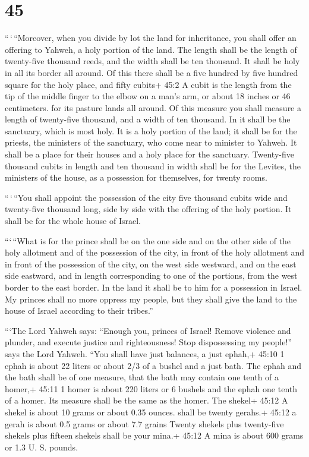 \hypertarget{section-43}{%
\section{45}\label{section-43}}

 ``\,`\,``Moreover, when you divide by lot the land for
inheritance, you shall offer an offering to Yahweh, a holy portion of
the land. The length shall be the length of twenty-five thousand reeds,
and the width shall be ten thousand. It shall be holy in all its border
all around.  Of this there shall be a five hundred by five
hundred square for the holy place, and fifty cubits+ 45:2 A cubit is the
length from the tip of the middle finger to the elbow on a man's arm, or
about 18 inches or 46 centimeters. for its pasture lands all around.
 Of this measure you shall measure a length of twenty-five
thousand, and a width of ten thousand. In it shall be the sanctuary,
which is most holy.  It is a holy portion of the land; it
shall be for the priests, the ministers of the sanctuary, who come near
to minister to Yahweh. It shall be a place for their houses and a holy
place for the sanctuary.  Twenty-five thousand cubits in
length and ten thousand in width shall be for the Levites, the ministers
of the house, as a possession for themselves, for twenty rooms.

 ``\,`\,``You shall appoint the possession of the city five
thousand cubits wide and twenty-five thousand long, side by side with
the offering of the holy portion. It shall be for the whole house of
Israel.

 ```\,``What is for the prince shall be on the one side and
on the other side of the holy allotment and of the possession of the
city, in front of the holy allotment and in front of the possession of
the city, on the west side westward, and on the east side eastward, and
in length corresponding to one of the portions, from the west border to
the east border.  In the land it shall be to him for a
possession in Israel. My princes shall no more oppress my people, but
they shall give the land to the house of Israel according to their
tribes.''

 ```The Lord Yahweh says: ``Enough you, princes of Israel!
Remove violence and plunder, and execute justice and righteousness! Stop
dispossessing my people!'' says the Lord Yahweh.  ``You
shall have just balances, a just ephah,+ 45:10 1 ephah is about 22
liters or about 2/3 of a bushel and a just bath.  The ephah
and the bath shall be of one measure, that the bath may contain one
tenth of a homer,+ 45:11 1 homer is about 220 liters or 6 bushels and
the ephah one tenth of a homer. Its measure shall be the same as the
homer.  The shekel+ 45:12 A shekel is about 10 grams or
about 0.35 ounces. shall be twenty gerahs.+ 45:12 a gerah is about 0.5
grams or about 7.7 grains Twenty shekels plus twenty-five shekels plus
fifteen shekels shall be your mina.+ 45:12 A mina is about 600 grams or
1.3 U. S. pounds.


